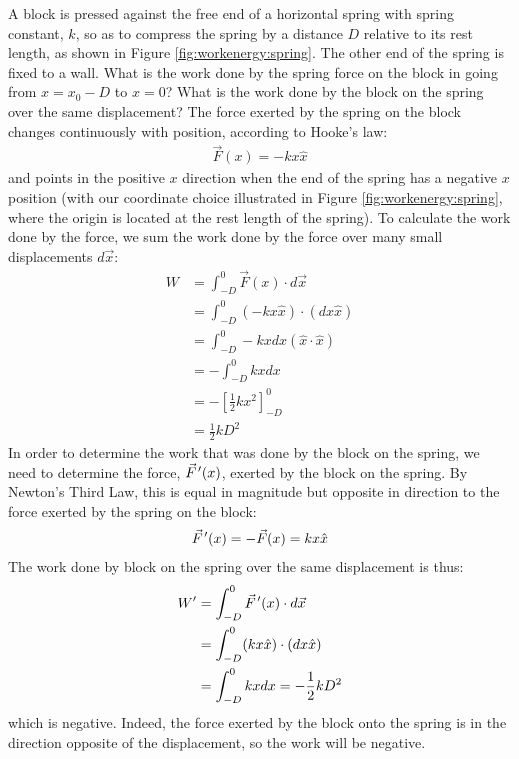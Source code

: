 \begin{example}{\label{ex:workenergy:spring} A block is pressed against the free end of a horizontal spring with spring constant, $k$, so as to compress the spring by a distance $D$ relative to its rest length, as shown in Figure \ref{fig:workenergy:spring}. The other end of the spring is fixed to a wall. What is the work done by the spring force on the block in going from $x=x_0-D$ to $x=0$? What is the work done by the block on the spring over the same displacement?
}
The force exerted by the spring on the block changes continuously with position, according to Hooke's law:
\begin{align*}
\vec F(x) = -kx \hat x
\end{align*}
and points in the positive $x$ direction when the end of the spring has a negative $x$ position (with our coordinate choice illustrated in Figure \ref{fig:workenergy:spring}, where the origin is located at the rest length of the spring). To calculate the work done by the force, we sum the work done by the force over many small displacements $d\vec x$:
\begin{align*}
W &= \int_{-D}^0 \vec F(x) \cdot d\vec x\\
&=\int_{-D}^0 (-kx \hat x) \cdot (dx \hat x)\\
&=\int_{-D}^0 -kxdx (\hat x \cdot \hat x)\\
&=-\int_{-D}^0 kx dx\\
&=-\left[\frac{1}{2}kx^2  \right]_{-D}^0\\
&=\frac{1}{2}kD^2
\end{align*}
In order to determine the work that was done by the block on the spring, we need to determine the force, $\pvec F'(x)$, exerted by the block on the spring. By Newton's Third Law, this is equal in magnitude but opposite in direction to the force exerted by the spring on the block:
\begin{align*}
\pvec F'(x) = -\vec F(x) = kx \hat x
\end{align*}
The work done by block on the spring over the same displacement is thus:
\begin{align*}
W' &= \int_{-D}^0 \pvec F'(x) \cdot d\vec x\\
&=\int_{-D}^0 (kx \hat x) \cdot (dx \hat x)\\
&=\int_{-D}^0 kx dx=-\frac{1}{2}kD^2\\
\end{align*}
which is negative. Indeed, the force exerted by the block onto the spring is in the direction opposite of the displacement, so the work will be negative. 
\end{example}


